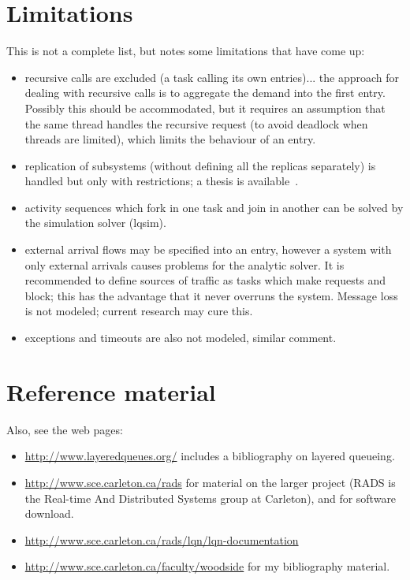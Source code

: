 \documentclass[11pt]{article}
\begin{document}
\section{Limitations}
\label{sec:limitations}

This is not a complete list, but notes some limitations that have come
up:

\begin{itemize}
\item recursive calls are excluded (a task calling its own
  entries)... the approach for dealing with recursive calls is to
  aggregate the demand into the first entry. Possibly this should be
  accommodated, but it requires an assumption that the same thread
  handles the recursive request (to avoid deadlock when threads are
  limited), which limits the behaviour of an entry.
\item replication of subsystems (without defining all the replicas
  separately) is handled but only with restrictions; a thesis is
  available~\cite{THESIS:pan-96}.
\item activity sequences which fork in one task and join in another can be solved by the simulation
  solver (lqsim).
\item external arrival flows may be specified into an entry, however a
  system with only external arrivals causes problems for the analytic
  solver. It is recommended to define sources of traffic as tasks
  which make requests and block; this has the advantage that it never
  overruns the system. Message loss is not modeled; current research
  may cure this.
\item exceptions and timeouts are also not modeled, similar comment.
\end{itemize}

\section{Reference material}
\label{sec:reference-material}

\begingroup
\renewcommand{\section}[2]{}

\endgroup

Also, see the web pages:

\begin{itemize}
\item \url{http://www.layeredqueues.org/} includes a bibliography on layered queueing.
\item \url{http://www.sce.carleton.ca/rads} for material on the larger project
  (RADS is the Real-time And Distributed Systems group at Carleton),
  and for software download. 
\item \url{http://www.sce.carleton.ca/rads/lqn/lqn-documentation}
\item \url{http://www.sce.carleton.ca/faculty/woodside} for my bibliography
  material.
\end{itemize}
\end{document}
